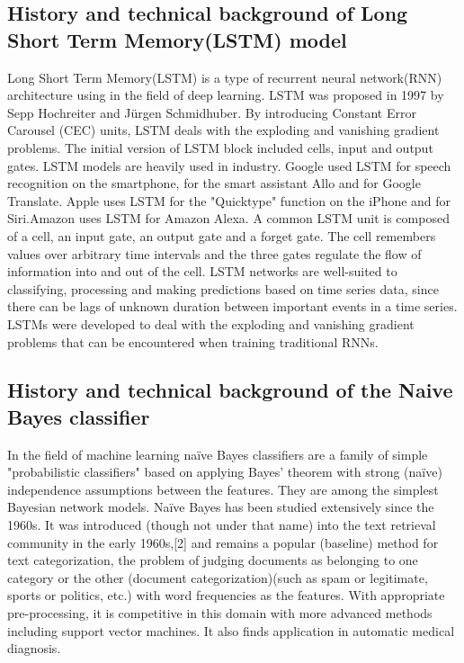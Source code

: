 \subsection{History and technical background of Long Short Term Memory(LSTM) model}
Long Short Term Memory(LSTM) is a type of recurrent neural network(RNN) architecture using in the field of deep learning. LSTM was proposed in 1997 by Sepp Hochreiter and Jürgen Schmidhuber. By introducing Constant Error Carousel (CEC) units, LSTM deals with the exploding and vanishing gradient problems. The initial version of LSTM block included cells, input and output gates. LSTM models are heavily used in industry. Google used LSTM for speech recognition on the smartphone, for the smart assistant Allo and for Google Translate. Apple uses LSTM for the "Quicktype" function on the iPhone and for Siri.Amazon uses LSTM for Amazon Alexa. A common LSTM unit is composed of a cell, an input gate, an output gate and a forget gate. The cell remembers values over arbitrary time intervals and the three gates regulate the flow of information into and out of the cell. LSTM networks are well-suited to classifying, processing and making predictions based on time series data, since there can be lags of unknown duration between important events in a time series. LSTMs were developed to deal with the exploding and vanishing gradient problems that can be encountered when training traditional RNNs.

\subsection{History and technical background of the Naive Bayes classifier}
In the field of machine learning naïve Bayes classifiers are a family of simple "probabilistic classifiers" based on applying Bayes' theorem with strong (naïve) independence assumptions between the features. They are among the simplest Bayesian network models. Naïve Bayes has been studied extensively since the 1960s. It was introduced (though not under that name) into the text retrieval community in the early 1960s,[2] and remains a popular (baseline) method for text categorization, the problem of judging documents as belonging to one category or the other (document categorization)(such as spam or legitimate, sports or politics, etc.) with word frequencies as the features. With appropriate pre-processing, it is competitive in this domain with more advanced methods including support vector machines. It also finds application in automatic medical diagnosis.


